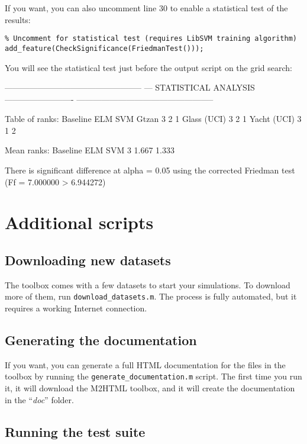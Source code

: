 If you want, you can also uncomment line 30 to enable a statistical test of the results:

\begin{lstlisting}
% Uncomment for statistical test (requires LibSVM training algorithm)
add_feature(CheckSignificance(FriedmanTest()));
\end{lstlisting}

\noindent You will see the statistical test just before the output script on the grid search:

\newpage

\begin{console}
--------------------------------------------------
--- STATISTICAL ANALYSIS -------------------------
--------------------------------------------------

Table of ranks:
Baseline  ELM  SVM
Gtzan               3    2    1
Glass (UCI)         3    2    1
Yacht (UCI)         3    1    2


Mean ranks:
Baseline    ELM    SVM
3  1.667  1.333

There is significant difference at alpha = 0.05 using the corrected Friedman test (Ff = 7.000000 > 6.944272)
\end{console}

\section{Additional scripts}

\subsection{Downloading new datasets}

The toolbox comes with a few datasets to start your simulations. To download more of them, run \verb|download_datasets.m|. The process is fully automated, but it requires a working Internet connection.

\subsection{Generating the documentation}

If you want, you can generate a full HTML documentation for the files in the toolbox by running the \verb|generate_documentation.m| script. The first time you run it, it will download the M2HTML toolbox, and it will create the documentation in the ``\textit{doc}'' folder.

\subsection{Running the test suite}

